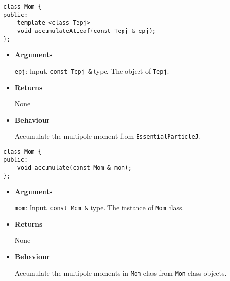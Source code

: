 
\begin{screen}
\begin{verbatim}
class Mom {
public:
    template <class Tepj>
    void accumulateAtLeaf(const Tepj & epj);
};
\end{verbatim}
\end{screen}

\begin{itemize}

\item {\bf Arguments}

  \texttt{epj}: Input. \texttt{const Tepj \&} type. The object of \texttt{Tepj}.

\item {\bf Returns}

  None.

\item {\bf Behaviour}

  Accumulate the multipole moment from \texttt{EssentialParticleJ}.

\end{itemize}


\begin{screen}
\begin{verbatim}
class Mom {
public:
    void accumulate(const Mom & mom);
};
\end{verbatim}
\end{screen}

\begin{itemize}

\item {\bf Arguments}

  \texttt{mom}: Input. \texttt{const Mom \&} type. The instance of \texttt{Mom} class.

\item {\bf Returns}

  None.

\item {\bf Behaviour}

  Accumulate the multipole moments in \texttt{Mom} class from \texttt{Mom} class objects.

\end{itemize}

